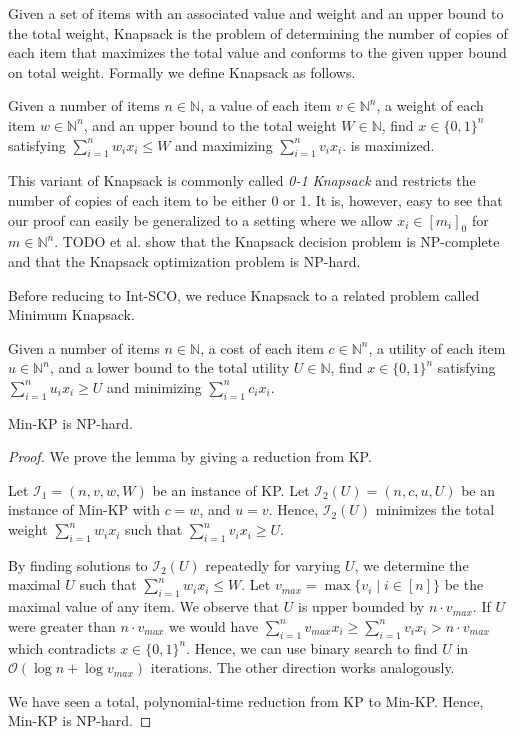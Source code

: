 Given a set of items with an associated value and weight and an upper bound to the total weight, Knapsack is the problem of determining the number of copies of each item that maximizes the total value and conforms to the given upper bound on total weight. Formally we define Knapsack as follows.

\begin{problem}[Knapsack (KP)]
Given a number of items $n \in \mathbb{N}$, a value of each item $v \in \mathbb{N}^n$, a weight of each item $w \in \mathbb{N}^n$, and an upper bound to the total weight $W \in \mathbb{N}$, find $x \in \{0,1\}^n$ satisfying $\sum_{i = 1}^n w_i x_i \leq W$ and maximizing $\sum_{i=1}^n v_i x_i$.
is maximized.
\end{problem}

This variant of Knapsack is commonly called \textit{0-1 Knapsack} and restricts the number of copies of each item to be either 0 or 1. It is, however, easy to see that our proof can easily be generalized to a setting where we allow $x_i \in [m_i]_0$ for $m \in \mathbb{N}^n$. TODO et al. show that the Knapsack decision problem is NP-complete and that the Knapsack optimization problem is NP-hard.

Before reducing to Int-SCO, we reduce Knapsack to a related problem called Minimum Knapsack.

\begin{problem}
Given a number of items $n \in \mathbb{N}$, a cost of each item $c \in \mathbb{N}^n$, a utility of each item $u \in \mathbb{N}^n$, and a lower bound to the total utility $U \in \mathbb{N}$, find $x \in \{0,1\}^n$ satisfying $\sum_{i = 1}^n u_i x_i \geq U$ and minimizing $\sum_{i=1}^n c_i x_i$.
\end{problem}

\begin{lemma}
Min-KP is NP-hard.
\end{lemma}

\begin{proof}
We prove the lemma by giving a reduction from KP.

Let $\mathcal{I}_1 = (n, v, w, W)$ be an instance of KP. Let $\mathcal{I}_2(U) = (n, c, u, U)$ be an instance of Min-KP with $c = w$, and $u = v$. Hence, $\mathcal{I}_2(U)$ minimizes the total weight $\sum_{i=1}^n w_i x_i$ such that $\sum_{i=1}^n v_i x_i \geq U$.

By finding solutions to $\mathcal{I}_2(U)$ repeatedly for varying $U$, we determine the maximal $U$ such that $\sum_{i=1}^n w_i x_i \leq W$. Let $v_{max} = \max\{v_i \mid i \in [n]\}$ be the maximal value of any item. We observe that $U$ is upper bounded by $n \cdot v_{max}$. If $U$ were greater than $n \cdot v_{max}$ we would have $\sum_{i=1}^n v_{max} x_i \geq \sum_{i=1}^n v_i x_i > n \cdot v_{max}$ which contradicts $x \in \{0,1\}^n$. Hence, we can use binary search to find $U$ in $\mathcal{O}(\log n + \log v_{max})$ iterations. The other direction works analogously.

We have seen a total, polynomial-time reduction from KP to Min-KP. Hence, Min-KP is NP-hard.
\end{proof}

